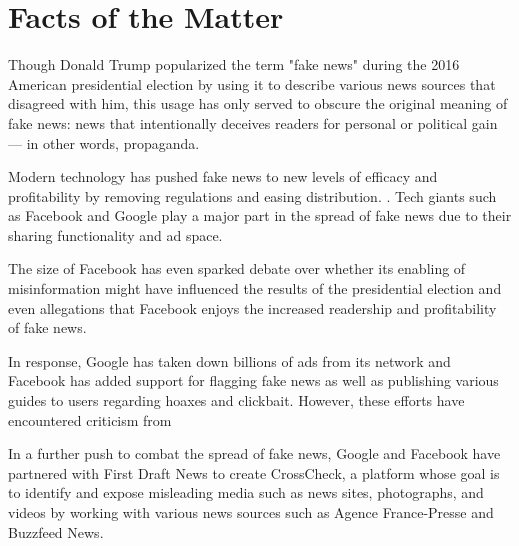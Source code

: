 

\section{Facts of the Matter}


Though Donald Trump popularized the term "fake news" during the 2016 American presidential election by using it to describe various news sources that disagreed with him, \cite{tc_what_is_fake_news} this usage has only served to obscure the original meaning of fake news: news that intentionally deceives readers for personal or political gain \cite{tc_what_is_fake_news }\cite{npr_fake_news} --- in other words, propaganda. \cite{telegraph_fake_news}

Modern technology has pushed fake news to new levels of efficacy and profitability by removing regulations and easing distribution. \cite{telegraph_fake_news}. Tech giants such as Facebook and Google play a major part in the spread of fake news due to their sharing functionality and ad space. \cite{cbs_fake_news, tc_google_took_down_ads}

The size of Facebook has even sparked debate over whether its enabling of misinformation might have influenced the results of the presidential election \cite{bbc_facebook_fake_news_crisis, wp_russian_election_propaganda} and even allegations that Facebook enjoys the increased readership and profitability of fake news. \cite{tc_facebook_responsibility}

In response, Google has taken down billions of ads from its network \cite{tc_google_took_down_ads} and Facebook has added support for flagging fake news as well as publishing various guides to users regarding hoaxes and clickbait. \cite{tc_fb_down_ranks_fake_news,fb_reduce_clickbait,fb_addressing_hoaxes,fb_spot_fake_news} However, these efforts have encountered criticism from  

In a further push to combat the spread of fake news, Google and Facebook have partnered with First Draft News to create CrossCheck, \cite{crosscheck_launch} a platform whose goal is to identify and expose misleading media such as news sites, photographs, and videos by working with various news sources such as Agence France-Presse and Buzzfeed News. \cite{tc_google_fb_partner,pcw_france_google_facebook}

